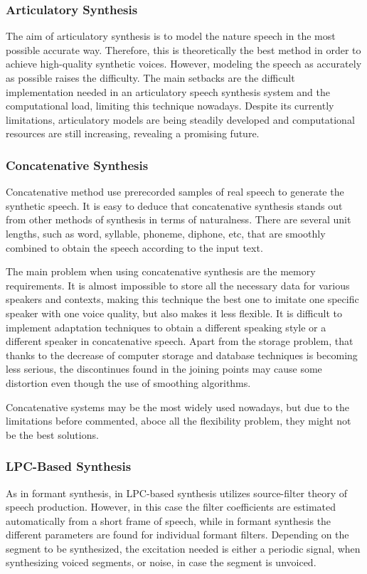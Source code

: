 \subsubsection{Articulatory Synthesis}
\label{articulatory_speech_synthesis}
The aim of articulatory synthesis is to model the nature speech in the most possible accurate way. Therefore, this is theoretically the best method in order to achieve high-quality synthetic voices. However, modeling the speech as accurately as possible raises the difficulty. The main setbacks are the difficult implementation needed in an articulatory speech synthesis system and the computational load, limiting this technique nowadays. Despite its currently limitations, articulatory models are being steadily developed and computational resources are still increasing, revealing a promising future.

\subsubsection{Concatenative Synthesis}
\label{concatenative_speech_synthesis}
Concatenative method use prerecorded samples of real speech to generate the synthetic speech. It is easy to deduce that concatenative synthesis stands out from other methods of synthesis in terms of naturalness. There are several unit lengths, such as word, syllable, phoneme, diphone, etc, that are smoothly combined to obtain the speech according to the input text. 

The main problem when using concatenative synthesis are the memory requirements. It is almost impossible to store all the necessary data for various speakers and contexts, making this technique the best one to imitate one specific speaker with one voice quality, but also makes it less flexible. It is difficult to implement adaptation techniques to obtain a different speaking style or a different speaker in concatenative speech. Apart from the storage problem, that thanks to the decrease of computer storage and database techniques is becoming less serious, the discontinues found in the joining points may cause some distortion even though the use of smoothing algorithms.

Concatenative systems may be the most widely used nowadays, but due to the limitations before commented, aboce all the flexibility problem, they might not be the best solutions.

\subsubsection{LPC-Based Synthesis}
\label{lpc_based_speech_synthesis}
As in formant synthesis, in LPC-based synthesis utilizes source-filter theory of speech production. However, in this case the filter coefficients are estimated automatically from a short frame of speech, while in formant synthesis the different parameters are found for individual formant filters. Depending on the segment to be synthesized, the excitation needed is either a periodic signal, when synthesizing voiced segments, or noise, in case the segment is unvoiced. 

